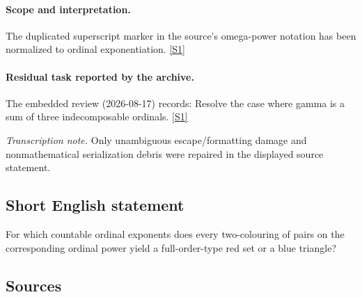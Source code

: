 \documentclass[11pt,a4paper]{article}
\newcommand{\sref}[2]{\hyperlink{source:#1:#2}{[S#2]}}
\begin{document}
\paragraph{Scope and interpretation.}

The duplicated superscript marker in the source’s omega-power notation has been normalized to ordinal exponentiation. \sref{2198}{1}

\paragraph{Residual task reported by the archive.}

The embedded review (2026-08-17) records: Resolve the case where gamma is a sum of three indecomposable ordinals. \sref{2198}{1}

{\small\emph{Transcription note.} Only unambiguous escape/formatting damage and nonmathematical serialization debris were repaired in the displayed source statement.}

\subsection{Short English statement}

For which countable ordinal exponents does every two-colouring of pairs on the corresponding ordinal power yield a full-order-type red set or a blue triangle?

\subsection{Sources}
\end{document}
